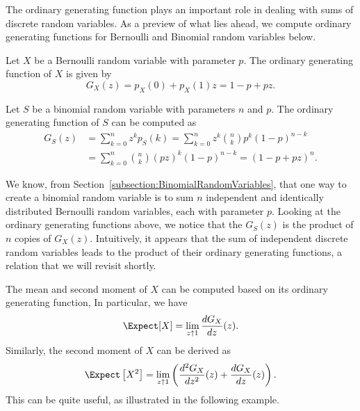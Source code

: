 The ordinary generating function plays an important role in dealing with sums of discrete random variables.
As a preview of what lies ahead, we compute ordinary generating functions for Bernoulli and Binomial random variables below.

\begin{example}
Let $X$ be a Bernoulli random variable with parameter $p$.
The ordinary generating function of $X$ is given by
\begin{equation*}
G_X(z) = p_X(0) + p_X(1) z
= 1 - p + pz .
\end{equation*}
\end{example}

\begin{example}
Let $S$ be a binomial random variable with parameters $n$ and $p$.
The ordinary generating function of $S$ can be computed as
\begin{equation*}
\begin{split}
G_S(z) &= \sum_{k=0}^{n} z^k p_S (k)
= \sum_{k=0}^{n} z^k \binom{n}{k} p^k (1 - p)^{n-k} \\
&= \sum_{k=0}^{n} \binom{n}{k} (pz)^k (1 - p)^{n-k}
= (1 - p + pz)^n .
\end{split}
\end{equation*}
\end{example}

We know, from Section~\ref{subsection:BinomialRandomVariables}, that one way to create a binomial random variable is to sum $n$ independent and identically distributed Bernoulli random variables, each with parameter $p$.
Looking at the ordinary generating functions above, we notice that the $G_S(z)$ is the product of $n$ copies of $G_X(z)$.
Intuitively, it appears that the sum of independent discrete random variables leads to the product of their ordinary generating functions, a relation that we will revisit shortly.

The mean and second moment of $X$ can be computed based on its ordinary generating function,
In particular, we have
\begin{equation*}
\Expect [X] = \lim_{z \uparrow 1} \frac{d G_X}{dz}(z) .
\end{equation*}
Similarly, the second moment of $X$ can be derived as
\begin{equation*}
\Expect \left[ X^2 \right]
= \lim_{z \uparrow 1} \left( \frac{d^2 G_X}{dz^2}(z) + \frac{d G_X}{dz}(z) \right) .
\end{equation*}
This can be quite useful, as illustrated in the following example.

